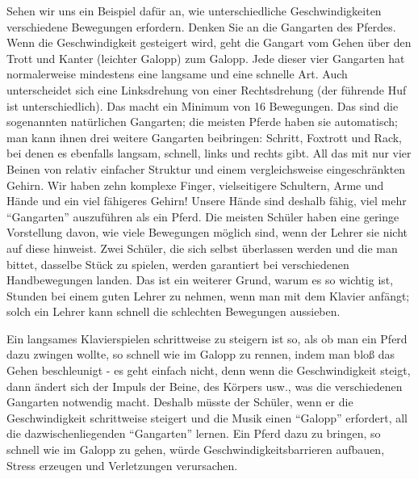 Sehen wir uns ein Beispiel dafür an, wie unterschiedliche Geschwindigkeiten verschiedene Bewegungen erfordern.
Denken Sie an die Gangarten des Pferdes.
Wenn die Geschwindigkeit gesteigert wird, geht die Gangart vom Gehen über den Trott und Kanter (leichter Galopp) zum Galopp.
Jede dieser vier Gangarten hat normalerweise mindestens eine langsame und eine schnelle Art.
Auch unterscheidet sich eine Linksdrehung von einer Rechtsdrehung (der führende Huf ist unterschiedlich).
Das macht ein Minimum von 16 Bewegungen.
Das sind die sogenannten natürlichen Gangarten; die meisten Pferde haben sie automatisch; man kann ihnen drei weitere Gangarten beibringen: Schritt, Foxtrott und Rack, bei denen es ebenfalls langsam, schnell, links und rechts gibt.
All das mit nur vier Beinen von relativ einfacher Struktur und einem vergleichsweise eingeschränkten Gehirn.
Wir haben zehn komplexe Finger, vielseitigere Schultern, Arme und Hände und ein viel fähigeres Gehirn!
Unsere Hände sind deshalb fähig, viel mehr \enquote{Gangarten} auszuführen als ein Pferd.
Die meisten Schüler haben eine geringe Vorstellung davon, wie viele Bewegungen möglich sind, wenn der Lehrer sie nicht auf diese hinweist.
Zwei Schüler, die sich selbst überlassen werden und die man bittet, dasselbe Stück zu spielen, werden garantiert bei verschiedenen Handbewegungen landen.
Das ist ein weiterer Grund, warum es so wichtig ist, Stunden bei einem guten Lehrer zu nehmen, wenn man mit dem Klavier anfängt; solch ein Lehrer kann schnell die schlechten Bewegungen aussieben.

Ein langsames Klavierspielen schrittweise zu steigern ist so, als ob man ein Pferd dazu zwingen wollte, so schnell wie im Galopp zu rennen, indem man bloß das Gehen beschleunigt - es geht einfach nicht, denn wenn die Geschwindigkeit steigt, dann ändert sich der Impuls der Beine, des Körpers usw., was die verschiedenen Gangarten notwendig macht.
Deshalb müsste der Schüler, wenn er die Geschwindigkeit schrittweise steigert und die Musik einen \enquote{Galopp} erfordert, all die dazwischenliegenden \enquote{Gangarten} lernen.
Ein Pferd dazu zu bringen, so schnell wie im Galopp zu gehen, würde Geschwindigkeitsbarrieren aufbauen, Stress erzeugen und Verletzungen verursachen.


